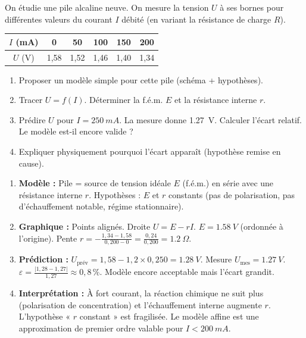 \documentclass[11pt]{article}
\begin{document}
\begin{exercice}
On étudie une pile alcaline neuve. On mesure la tension $U$ à ses bornes pour différentes valeurs du courant $I$ débité (en variant la résistance de charge $R$).
\begin{center}
\begin{tabular}{|c|ccccc|}\hline
\rowcolor{popblueL} $I$ (mA) & 0 & 50 & 100 & 150 & 200 \\ \hline
$U$ (V) & 1,58 & 1,52 & 1,46 & 1,40 & 1,34 \\ \hline
\end{tabular}
\end{center}
\begin{enumerate}
\item Proposer un modèle simple pour cette pile (schéma + hypothèses).
\item Tracer $U = f(I)$. Déterminer la f.é.m. $E$ et la résistance interne $r$.
\item Prédire $U$ pour $I = \SI{250}{mA}$. La mesure donne \SI{1,27}{V}. Calculer l'écart relatif. Le modèle est-il encore valide ?
\item Expliquer physiquement pourquoi l'écart apparaît (hypothèse remise en cause).
\end{enumerate}
\end{exercice}

\begin{corrige}
\begin{enumerate}
\item \textbf{Modèle :} Pile = source de tension idéale $E$ (f.é.m.) en série avec une résistance interne $r$. Hypothèses : $E$ et $r$ constants (pas de polarisation, pas d'échauffement notable, régime stationnaire).
\item \textbf{Graphique :} Points alignés. Droite $U = E - rI$. $E = \SI{1,58}{V}$ (ordonnée à l'origine). Pente $r = -\frac{1,34 - 1,58}{0,200 - 0} = \frac{0,24}{0,200} = \SI{1,2}{\Omega}$.
\item \textbf{Prédiction :} $U_{\text{prév}} = 1,58 - 1,2 \times 0,250 = \SI{1,28}{V}$. Mesure $U_{\text{mes}} = \SI{1,27}{V}$. $\varepsilon = \frac{|1,28-1,27|}{1,27} \approx 0,8\,\%$. Modèle encore acceptable mais l'écart grandit.
\item \textbf{Interprétation :} À fort courant, la réaction chimique ne suit plus (polarisation de concentration) et l'échauffement interne augmente $r$. L'hypothèse « $r$ constant » est fragilisée. Le modèle affine est une approximation de premier ordre valable pour $I < \SI{200}{mA}$.
\end{enumerate}
\end{corrige}
\end{document}
